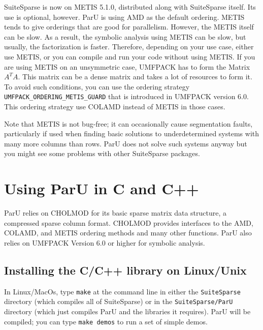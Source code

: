 \documentclass[12pt]{article}
\begin{document}
SuiteSparse is now on METIS 5.1.0, distributed along with SuiteSparse itself.
Its use is optional, however. ParU is using AMD as the default ordering. METIS
tends to give orderings that are good for parallelism. However, the METIS itself
can be slow. As a result, the symbolic analysis using METIS can be slow, but
usually, the factorization is faster. Therefore, depending on your use case,
either use METIS, or you can compile and run your code without using METIS.
If you are using METIS on an unsymmetric case, UMFPACK has to form the Matrix
$A^{T}A$. This matrix can be a dense matrix and takes a lot of resources to form
it. To avoid such conditions, you can use the ordering strategy
\verb'UMFPACK_ORDERING_METIS_GUARD' that is introduced in UMFPACK version 6.0.
This ordering strategy use COLAMD instead of METIS in those cases.

Note that METIS is not bug-free; it can occasionally cause segmentation 
faults, particularly if used when finding basic solutions to underdetermined 
systems with many more columns than rows. ParU does not solve such 
systems anyway but you might see some problems with other SuiteSparse packages.

\section{Using ParU in C and C++}

ParU relies on CHOLMOD for its basic sparse matrix data structure, a compressed 
sparse column format.  CHOLMOD provides interfaces to the AMD, COLAMD, and METIS
ordering methods and many other functions. ParU also relies on UMFPACK Version 
6.0 or higher for symbolic analysis. 


\subsection{Installing the C/C++ library on Linux/Unix}
In Linux/MacOs, type \verb'make' at the command line in either the 
\verb'SuiteSparse' directory (which compiles all of SuiteSparse) or in the 
\verb'SuiteSparse/ParU' directory (which just compiles ParU and the libraries 
it requires).  ParU will be compiled; you can type \verb'make demos' to run a
set of simple demos.
\end{document}
